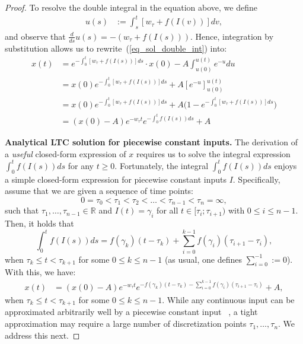 \documentclass[12pt]{article}
\newcommand{\RE}{\mathbb{R}}
\begin{document}
\begin{proof}
\noindent To resolve the double integral in the equation above, we define
\begin{align*}
u(s) & := \int_s^t [w_\tau + f(I(v))] dv,
\end{align*}
and observe that $\frac{d}{ds} u(s) = - (w_\tau + f(I(s)))$. Hence, integration by substitution allows us to rewrite~(\ref{eq_sol_double_int}) into:
\begin{align}
x(t) & = e^{- \int_0^t[w_\tau + f(I(s))] ds} \cdot x(0) - A \int_{u(0)}^{u(t)} e^{ - u } du \nonumber\\
& = x(0) e^{- \int_0^t[w_\tau + f(I(s))] ds} + A [ e^{-u} ]_{u(0)}^{u(t)} \nonumber\\
& = x(0) e^{- \int_0^t[w_\tau + f(I(s))] ds} + A \big( 1 - e^{- \int_0^t [w_\tau + f(I(s))] ds} \big) \nonumber\\
& = (x(0) - A) e^{-w_\tau t} e^{- \int_0^t f(I(s)) ds} + A \label{eq:ground:truth}
\end{align}

\noindent \textbf{Analytical LTC solution for piecewise constant inputs.} The derivation of a \emph{useful} closed-form expression of $x$ requires us to solve the integral expression $\int_0^t f(I(s)) ds$ for any $t \geq 0$. Fortunately, the integral $\int_0^t f(I(s)) ds$ enjoys a simple closed-form expression for piecewise constant inputs $I$. Specifically, assume that we are given a sequence of time points:
\[
0 = \tau_0 < \tau_1 < \tau_2 < \ldots < \tau_{n - 1} < \tau_n = \infty,
\]
such that $\tau_1,\ldots,\tau_{n-1} \in \RE$ and $I(t) = \gamma_i$ for all $t \in [\tau_i ; \tau_{i + 1})$ with $0 \leq i \leq n - 1$. Then, it holds that
\begin{equation}
\label{eq:discretized_int}
\int_0^t f(I(s)) ds =
f(\gamma_k) (t - \tau_k) + \sum_{i = 0}^{k-1} f(\gamma_i) (\tau_{i + 1} - \tau_i),
\end{equation}
when $\tau_k \leq t < \tau_{k + 1}$ for some $0 \leq k \leq n - 1$ (as usual, one defines $\sum_{i = 0}^{-1} := 0$). With this, we have:
\begin{align}
\label{eq:ltc_solution_in_discrete}
x(t) & = (x(0) - A) e^{-w_\tau t} e^{- f(\gamma_k) (t - \tau_k) - \sum_{i = 0}^{k-1} f(\gamma_i) (\tau_{i + 1} - \tau_i) } + A,
\end{align}
when $\tau_k \leq t < \tau_{k + 1}$ for some $0 \leq k \leq n - 1$. While any continuous input can be approximated arbitrarily well by a piecewise constant input~ \cite{Rudin76}, a tight approximation may require a large number of discretization points $\tau_1,\ldots,\tau_n$. We address this next.


\end{proof}
\end{document}
